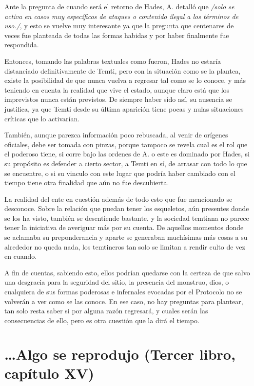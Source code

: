\documentclass[
  spanish,
]{book}
\begin{document}
Ante la pregunta de cuando será el retorno de Hades, A. detalló que \emph{/solo se activa en casos muy específicos de ataques o contenido ilegal a los términos de uso./}, y esto se vuelve muy interesante ya que la pregunta que centenares de veces fue planteada de todas las formas habidas y por haber finalmente fue respondida.

Entonces, tomando las palabras textuales como fueron, Hades no estaría distanciado definitivamente de Temti, pero con la situación como se la plantea, existe la posibilidad de que nunca vuelva a regresar tal como se lo conoce, y más teniendo en cuenta la realidad que vive el estado, aunque claro está que los imprevistos nunca están previstos. De siempre haber sido así, su ausencia se justifica, ya que Temti desde su última aparición tiene pocas y nulas situaciones críticas que lo activarían.

También, aunque parezca información poco rebuscada, al venir de orígenes oficiales, debe ser tomada con pinzas, porque tampoco se revela cual es el rol que el poderoso tiene, si corre bajo las ordenes de A. o este es dominado por Hades, si su propósito es defender a cierto sector, a Temti en sí, de arrasar con todo lo que se encuentre, o si su vinculo con este lugar que podría haber cambiado con el tiempo tiene otra finalidad que aún no fue descubierta.

La realidad del ente en cuestión además de todo esto que fue mencionado se desconoce. Sobre la relación que puedan tener los esqueletos, aún presentes donde se los ha visto, también se desentiende bastante, y la sociedad temtiana no parece tener la iniciativa de averiguar más por su cuenta. De aquellos momentos donde se aclamaba su preponderancia y aparte se generaban muchísimas más cosas a su alrededor no queda nada, los temtineros tan solo se limitan a rendir culto de vez en cuando.

A fin de cuentas, sabiendo esto, ellos podrían quedarse con la certeza de que salvo una desgracia para la seguridad del sitio, la presencia del monstruo, dios, o cualquiera de sus formas poderosas e infernales evocadas por el Protocolo no se volverán a ver como se las conoce. En ese caso, no hay preguntas para plantear, tan solo resta saber si por alguna razón regresará, y cuales serán las consecuencias de ello, pero es otra cuestión que la dirá el tiempo.

\hypertarget{algo-se-reprodujo-tercer-libro-capuxedtulo-xv}{%
\section{\ldots Algo se reprodujo (Tercer libro, capítulo XV)}\label{algo-se-reprodujo-tercer-libro-capuxedtulo-xv}}
\end{document}
